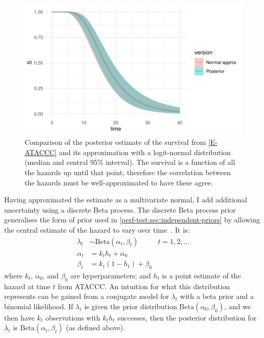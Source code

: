 \documentclass[thesis.tex]{subfiles}
\begin{document}
\begin{figure}
  \centering \includegraphics{cis-perfect-testing/ataccc-approximation-survival}
  \caption[Approximating the ATACCC posterior survival as a logit-normal]{Comparison of the posterior estimate of the survival from \cref{E-ATACCC} and its approximation with a logit-normal distribution (median and central 95\% interval). The survival is a function of all the hazards up until that point, therefore the correlation between the hazards must be well-approximated to have these agree. \label{perf-test:fig:approximate-ATACCC-survival}}
\end{figure}

Having approximated the estimate as a multivariate normal, I add additional uncertainty using a discrete Beta process.
The discrete Beta process prior generalises the form of prior used in \cref{perf-test:sec:independent-priors} by allowing the central estimate of the hazard to vary over time~\autocite{ibrahimBayesian,sunStatisticala}.
It is:
\begin{align}
  \lambda_t &\sim \text{Beta}(\alpha_t, \beta_t) &t = 1, 2, \dots \\
  \alpha_t &= k_t h_t + \alpha_0 \\
  \beta_t &= k_t (1 - h_t) + \beta_0
\end{align}
where $k_t$, $\alpha_0$, and $\beta_0$ are hyperparameters; and $h_t$ is a point estimate of the hazard at time $t$ from ATACCC.
An intuition for what this distribution represents can be gained from a conjugate model for $\lambda_t$ with a beta prior and a binomial likelihood.
If $\lambda_t$ is given the prior distribution $\text{Beta}(\alpha_0, \beta_0)$, and we then have $k_t$ observations with $k_t h_t$ successes, then the posterior distribution for $\lambda_t$ is $\text{Beta}(\alpha_t, \beta_t)$ (as defined above).
\end{document}

